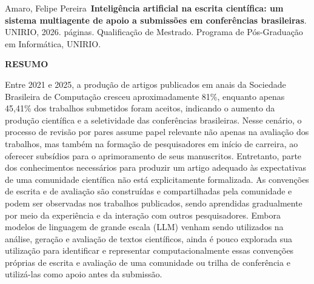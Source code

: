 Amaro, Felipe Pereira~\textbf{Inteligência artificial na escrita científica: um sistema multiagente de apoio a submissões em conferências brasileiras}. UNIRIO, 2026. \pageref{LastPage} páginas. Qualificação de Mestrado. Programa de Pós-Graduação em Informática, UNIRIO.
\vspace{10pt}
\begin{center}
    \textbf{RESUMO}
    \vspace{10pt}
\end{center}


Entre 2021 e 2025, a produção de artigos publicados em anais da Sociedade Brasileira de Computação cresceu aproximadamente 81\%, enquanto apenas 45,41\% dos trabalhos submetidos foram aceitos, indicando o aumento da produção científica e a seletividade das conferências brasileiras. Nesse cenário, o processo de revisão por pares assume papel relevante não apenas na avaliação dos trabalhos, mas também na formação de pesquisadores em início de carreira, ao oferecer subsídios para o aprimoramento de seus manuscritos. Entretanto, parte dos conhecimentos necessários para produzir um artigo adequado às expectativas de uma comunidade científica não está explicitamente formalizada. As convenções de escrita e de avaliação são construídas e compartilhadas pela comunidade e podem ser observadas nos trabalhos publicados, sendo aprendidas gradualmente por meio da experiência e da interação com outros pesquisadores. Embora modelos de linguagem de grande escala (LLM) venham sendo utilizados na análise, geração e avaliação de textos científicos, ainda é pouco explorada sua utilização para identificar e representar computacionalmente essas convenções próprias de escrita e avaliação de uma comunidade ou trilha de conferência e utilizá-las como apoio antes da submissão.

